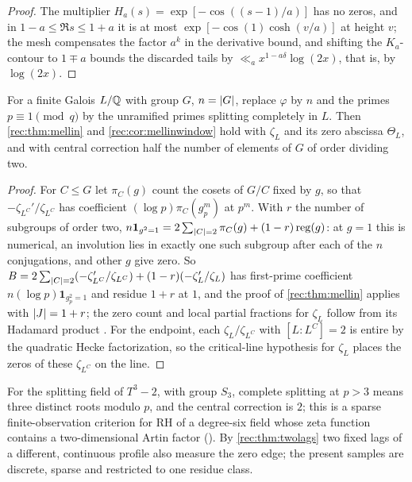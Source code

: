 \begin{proof}
The multiplier $H_a(s)=\exp[-\cos((s-1)/a)]$ has no zeros, and in $1-a\le\Re s\le1+a$ it is at most
$\exp[-\cos(1)\cosh(v/a)]$ at height $v$; the mesh compensates the factor $a^k$ in the derivative bound, and shifting the
$K_a$-contour to $1\mp a$ bounds the discarded tails by
$\ll_ax^{1-a\delta}\log(2x)$, that is, by $\log(2x)$.
\end{proof}

\begin{theorem}\label{rec:thm:mellingalois}
For a finite Galois $L/\mathbb{Q}$ with group $G$, $n=\lvert G\rvert$, replace $\varphi$ by $n$ and the primes $p\equiv1\pmod q$ by the
unramified primes splitting completely in $L$. Then \cref{rec:thm:mellin} and \cref{rec:cor:mellinwindow}
hold with $\zeta_L$ and its zero abscissa $\Theta_L$, and with central correction half the number of
elements of $G$ of order dividing two.
\end{theorem}

\begin{proof}
For $C\le G$ let $\pi_C(g)$ count the cosets of $G/C$ fixed by $g$, so that $-\zeta_{L^C}'/\zeta_{L^C}$ has coefficient
$(\log p)\pi_C(g_p^m)$ at $p^m$. With $r$ the number of subgroups of order two,
$n\mathbf 1_{g^2=1}=2\sum_{\lvert C\rvert=2}\pi_C(g)+(1-r)\operatorname{reg}(g)$: at $g=1$ this is numerical, an involution lies in exactly
one such subgroup after each of the $n$ conjugations, and other $g$ give zero. So
$B=2\sum_{\lvert C\rvert=2}(-\zeta_{L^C}'/\zeta_{L^C})+(1-r)(-\zeta_L'/\zeta_L)$ has first-prime coefficient $n(\log p)\mathbf 1_{g_p^2=1}$ and residue $1+r$
at $1$, and the proof of \cref{rec:thm:mellin} applies with $\lvert J\rvert=1+r$; the zero count and local partial
fractions for $\zeta_L$ follow from its Hadamard product \cite{LagariasOdlyzko1977Effective}. For the endpoint,
each $\zeta_L/\zeta_{L^C}$ with $[L:L^C]=2$ is entire by the quadratic Hecke factorization, so the critical-line
hypothesis for $\zeta_L$ places the zeros of these $\zeta_{L^C}$ on the line.
\end{proof}

For the splitting field of $T^3-2$, with group $S_3$, complete splitting at $p>3$ means three distinct
roots modulo $p$, and the central correction is $2$; this is a sparse finite-observation criterion for
RH of a degree-six field whose zeta function contains a two-dimensional Artin factor
(). By
\cref{rec:thm:twolags} two fixed lags of a different, continuous profile also measure the zero edge; the
present samples are discrete, sparse and restricted to one residue class.

